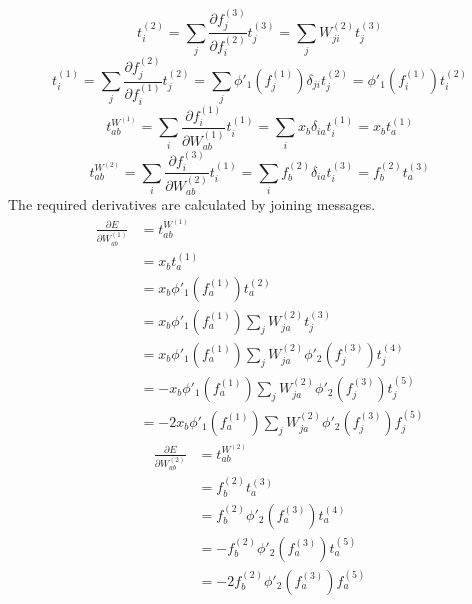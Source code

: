 \documentclass[fleqn]{article}
\begin{document}
\begin{equation}
    t^{(2)}_i = \sum_j \frac{\partial f^{(3)}_j}{\partial f^{(2)}_i} t^{(3)}_j = \sum_j W^{(2)}_{ji} t^{(3)}_j
\end{equation}
\begin{equation}
    t^{(1)}_i = \sum_j \frac{\partial f^{(2)}_j}{\partial f^{(1)}_i} t^{(2)}_j = \sum_j \phi'_1 \left ( f^{(1)}_j \right ) \delta_{ji} t^{(2)}_j = \phi'_1 \left ( f^{(1)}_i \right ) t^{(2)}_i
\end{equation}
\begin{equation}
    t^{W^{(1)}}_{ab} = \sum_i \frac{\partial f^{(1)}_i}{\partial W^{(1)}_{ab}} t^{(1)}_i = \sum_i x_b \delta_{ia} t^{(1)}_i = x_b t^{(1)}_a
\end{equation}
\begin{equation}
    t^{W^{(2)}}_{ab} = \sum_i \frac{\partial f^{(3)}_i}{\partial W^{(2)}_{ab}} t^{(1)}_i = \sum_i f^{(2)}_b \delta_{ia} t^{(3)}_i = f^{(2)}_b t^{(3)}_a
\end{equation}
The required derivatives are calculated by joining messages.
\begin{equation}
    \begin{split}
        \frac{\partial E}{\partial W^{(1)}_{ab}} & = t^{W^{(1)}}_{ab} \\
        & = x_b t^{(1)}_a \\
        & = x_b \phi'_1 \left ( f^{(1)}_a \right ) t^{(2)}_a \\
        & = x_b \phi'_1 \left ( f^{(1)}_a \right ) \sum_j W^{(2)}_{ja} t^{(3)}_j \\
        & = x_b \phi'_1 \left ( f^{(1)}_a \right ) \sum_j W^{(2)}_{ja} \phi'_2 \left ( f^{(3)}_j \right ) t^{(4)}_j \\
        & = - x_b \phi'_1 \left ( f^{(1)}_a \right ) \sum_j W^{(2)}_{ja} \phi'_2 \left ( f^{(3)}_j \right ) t^{(5)}_j \\
        & = - 2 x_b \phi'_1 \left ( f^{(1)}_a \right ) \sum_j W^{(2)}_{ja} \phi'_2 \left ( f^{(3)}_j \right ) f^{(5)}_j
    \end{split}
\end{equation}
\begin{equation}
    \begin{split}
        \frac{\partial E}{\partial W^{(2)}_{ab}} & = t^{W^{(2)}}_{ab} \\
        & = f^{(2)}_b t^{(3)}_a \\
        & = f^{(2)}_b \phi'_2 \left ( f^{(3)}_a \right ) t^{(4)}_a \\
        & = - f^{(2)}_b \phi'_2 \left ( f^{(3)}_a \right ) t^{(5)}_a \\
        & = - 2 f^{(2)}_b \phi'_2 \left ( f^{(3)}_a \right ) f^{(5)}_a \\
    \end{split}
\end{equation}
\end{document}

